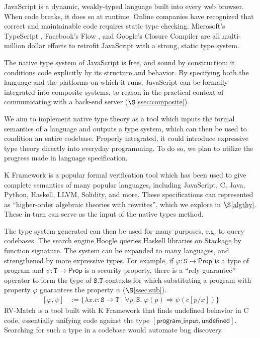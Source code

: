 \documentclass[conference]{IEEEtran}
\theoremstyle{definition}
\newcommand{\msf}[1]{\mathsf{#1}}
\newcommand{\mtt}[1]{\mathtt{#1}}
\newcommand{\ra}{\Rightarrow}
\newcommand{\Prop}{\msf{Prop}}
\newcommand{\tts}{\mtt{S}}
\newcommand{\ttt}{\mtt{T}}
\begin{document}
JavaScript is a dynamic, weakly-typed language built into every web browser. When code breaks, it does so at runtime.  Online companies have recognized that correct and maintainable code requires static type checking. Microsoft's TypeScript \cite{microsoft}, Facebook's Flow \cite{facebook}, and Google's Closure Compiler \cite{google} are all multi-million dollar efforts to retrofit JavaScript with a strong, static type system.

The native type system of JavaScript is free, and sound by construction: it conditions code explicitly by its structure and behavior.  By specifying both the language and the platforms on which it runs, JavaScript can be formally integrated into composite systems, to reason in the practical context of communicating with a back-end server ($\S$\ref{ssec:composite}).

We aim to implement native type theory as a tool which inputs the formal semantics of a language and outputs a type system, which can then be used to condition an entire codebase. Properly integrated, it could introduce expressive type theory directly into everyday programming. To do so, we plan to utilize the progress made in language specification.

K Framework \cite{kframe} is a popular formal verification tool which has been used to give complete semantics of many popular languages, including JavaScript, C, Java, Python, Haskell, LLVM, Solidity, and more.  These specifications can represented as ``higher-order algebraic theories with rewrites'', which we explore in $\S$\ref{algthy}. These in turn can serve as the input of the native types method.

The type system generated can then be used for many purposes, e.g. to query codebases. The search engine Hoogle \cite{hoogle} queries Haskell libraries on Stackage by function signature. The system can be expanded to many languages, and strengthened by more expressive types. For example, if $\varphi:\tts\to \Prop$ is a type of program and $\psi:\ttt\to \Prop$ is a security property, there is a ``rely-guarantee'' operator to form the type of $\tts.\ttt$-contexts for which substituting a program with property $\varphi$ guarantees the property $\psi$ ($\S$\ref{ssec:sub}).
\[\begin{array}{ll}
    [\varphi, \psi] & := \{\lambda x.c:\tts\to \ttt \;|\; \forall p : \tts.\; \varphi(p) \ra \psi(c[p/x])\}
\end{array} \]
RV-Match \cite{RVMatch} is a tool built with K Framework that finds undefined behavior in C code, essentially unifying code against the type $[\mathsf{program\_input}, \mathsf{undefined}]$.  Searching for such a type in a codebase would automate bug discovery.
\end{document}

